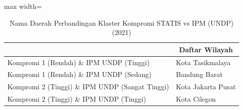 \begin{table}[H]
\centering
\caption{Nama Daerah Perbandingan Klaster Kompromi STATIS vs IPM (UNDP) (2021)} \label{tab:sample1comp_ipm_name_2021}
\begin{adjustbox}{max width=\textwidth}
\begin{tabular}{|>{\centering\arraybackslash}p{4cm}|p{10cm}|}
\hline
\multicolumn{1}{|c|}{\textbf{Kategori}} & \multicolumn{1}{c|}{\textbf{Daftar Wilayah}} \\
\hline
Kompromi 1 (Rendah) \& IPM UNDP (Tinggi) & Kota Tasikmalaya \\
\hline
Kompromi 1 (Rendah) \& IPM UNDP (Sedang) & Bandung Barat \\
\hline
Kompromi 2 (Tinggi) \& IPM UNDP (Sangat Tinggi) & Kota Jakarta Pusat \\
\hline
Kompromi 2 (Tinggi) \& IPM UNDP (Tinggi) & Kota Cilegon \\
\hline
\end{tabular}
\end{adjustbox}
\end{table}